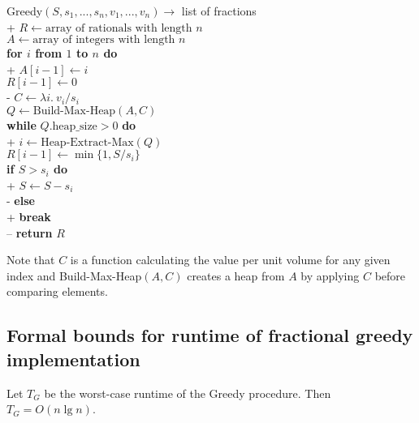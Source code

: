 \documentclass{article}
\begin{document}
\begin{pseudo}
    Greedy$(S, s_1, ..., s_n, v_1, ..., v_n)\to$ list of fractions\\+
        $R\leftarrow\text{array of rationals with length }n$\\
        $A\leftarrow\text{array of integers with length }n$\\
        \textbf{for $i$ from $1$ to $n$ do}\\+
            $A[i-1] \leftarrow i$\\
            $R[i-1] \leftarrow 0$\\-
        $C\leftarrow \lambda i.\:v_i/s_i$\\
        $Q\leftarrow\text{Build-Max-Heap}(A,C)$\\
        \textbf{while} $Q.\text{heap\_size}>0$ \textbf{do}\\+
            $i\leftarrow\text{Heap-Extract-Max}(Q)$\\
            $R[i-1]\leftarrow \min\{1, S/s_i\}$\\
            \textbf{if $S>s_i$ do}\\+
                $S\leftarrow S-s_i$\\-
            \textbf{else}\\+
                \textbf{break}\\--
        \textbf{return} $R$
\end{pseudo}

Note that $C$ is a function calculating the value per unit volume
for any given index and Build-Max-Heap$(A,C)$ creates a heap from $A$
by applying $C$ before comparing elements.

\subsection{Formal bounds for runtime of fractional greedy implementation}

\begin{claim}
    Let $T_G$ be the worst-case runtime of the Greedy procedure. Then $T_G=O(n\lg n)$.
\end{claim}
\end{document}

